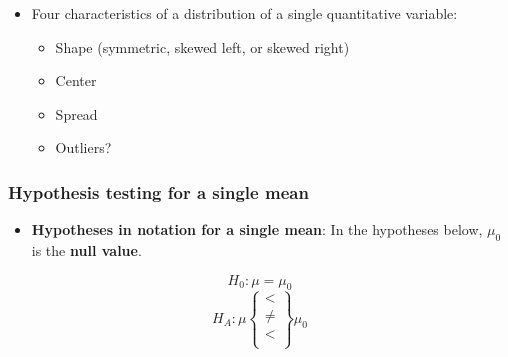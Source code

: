 \documentclass[
]{report}
\newenvironment{Shaded}{\begin{snugshade}}{\end{snugshade}}
\newcommand{\AttributeTok}[1]{\textcolor[rgb]{0.13,0.29,0.53}{#1}}
\newcommand{\CommentTok}[1]{\textcolor[rgb]{0.56,0.35,0.01}{\textit{#1}}}
\newcommand{\FunctionTok}[1]{\textcolor[rgb]{0.13,0.29,0.53}{\textbf{#1}}}
\newcommand{\NormalTok}[1]{#1}
\newcommand{\SpecialCharTok}[1]{\textcolor[rgb]{0.81,0.36,0.00}{\textbf{#1}}}
\newcommand{\StringTok}[1]{\textcolor[rgb]{0.31,0.60,0.02}{#1}}
\providecommand{\tightlist}{%
  \setlength{\itemsep}{0pt}\setlength{\parskip}{0pt}}
\begin{document}
\begin{itemize}
\begin{Shaded}
\begin{Highlighting}[]
\NormalTok{object }\SpecialCharTok{\%\textgreater{}\%} \CommentTok{\# Data set piped into...}
    \FunctionTok{ggplot}\NormalTok{(}\FunctionTok{aes}\NormalTok{(}\AttributeTok{x =}\NormalTok{ variable)) }\SpecialCharTok{+} \CommentTok{\# Name variable to plot}
    \FunctionTok{geom\_dotplot}\NormalTok{() }\SpecialCharTok{+} \CommentTok{\# Create dotplot }
    \FunctionTok{labs}\NormalTok{(}\AttributeTok{title =} \StringTok{"Don\textquotesingle{}t forget to title the plot!"}\NormalTok{, }\CommentTok{\# Title for plot}
        \AttributeTok{x =} \StringTok{"x{-}axis label"}\NormalTok{, }\CommentTok{\# Label for x axis}
        \AttributeTok{y =} \StringTok{"y{-}axis label"}\NormalTok{) }\CommentTok{\# Label for y axis}
\end{Highlighting}
\end{Shaded}
\item
  Four characteristics of a distribution of a single quantitative variable:

  \begin{itemize}
  \item
    Shape (symmetric, skewed left, or skewed right)
  \item
    Center
  \item
    Spread
  \item
    Outliers?
  \end{itemize}
\end{itemize}

\newpage

\subsubsection*{Hypothesis testing for a single mean}\label{hypothesis-testing-for-a-single-mean}

\begin{itemize}
\tightlist
\item
  \textbf{Hypotheses in notation for a single mean}: In the hypotheses below, \(\mu_0\) is the \textbf{null value}.
\end{itemize}

\[H_0: \mu = \mu_0\]
\[H_A: \mu\left\{
\begin{array}{ll}
< \\
\ne \\
< \\
\end{array}
\right\}
\mu_0 \]
\end{document}
